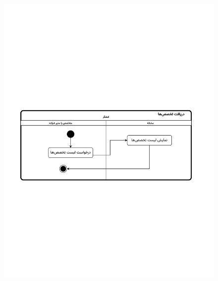 \begin{figure}[ht!]
	\centering
	\includegraphics[scale=0.6, page=1]{figs/OOD-activity-getspec.pdf}
\end{figure}
\FloatBarrier
\newpage


